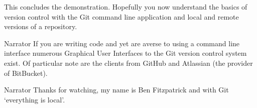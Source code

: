 \documentclass{screenplay} %
\begin{document}
\begin{dialogue} This concludes the demonstration.
\newline
\newline
Hopefully you now understand the basics of version control with the Git command line application and local and remote versions of a repository. %
\end{dialogue}

\begin{dialogue}{Narrator}
If you are writing code and yet are averse to using a command line interface numerous Graphical User Interfaces to the Git version control system exist.
\newline
\newline
Of particular note are the clients from GitHub and Atlassian (the provider of BitBucket).
\end{dialogue}

\begin{dialogue}{Narrator}
Thanks for watching, my name is Ben Fitzpatrick and with Git `everything is local'.
\end{dialogue}













\fadeout
\theend
\end{document}
